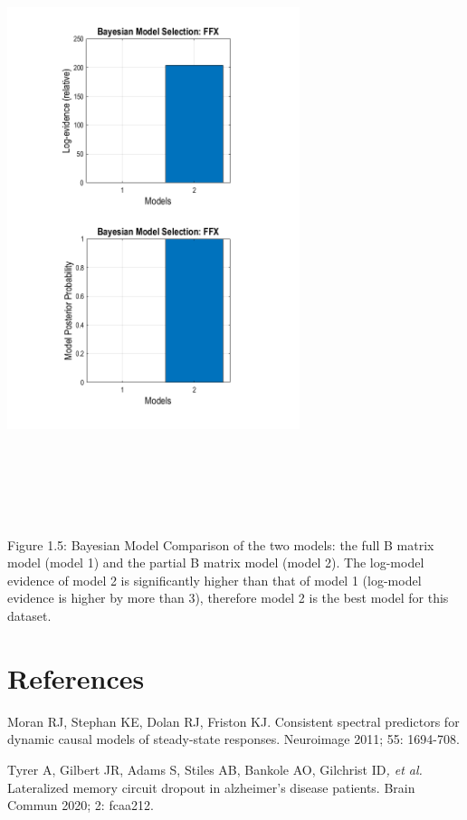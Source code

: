 \includegraphics[width=3.36083in,height=6.93814in]{BMC.png}

Figure 1.5: Bayesian Model Comparison of the two models: the full B
matrix model (model 1) and the partial B matrix model (model 2). The
log-model evidence of model 2 is significantly higher than that of model
1 (log-model evidence is higher by more than 3), therefore model 2 is
the best model for this dataset.

\section{\texorpdfstring{\textbf{References}}{References}}\label{references}

Moran RJ, Stephan KE, Dolan RJ, Friston KJ. Consistent spectral
predictors for dynamic causal models of steady-state responses.
Neuroimage 2011; 55: 1694-708.

Tyrer A, Gilbert JR, Adams S, Stiles AB, Bankole AO, Gilchrist ID\emph{,
et al.} Lateralized memory circuit dropout in alzheimer's disease
patients. Brain Commun 2020; 2: fcaa212.
